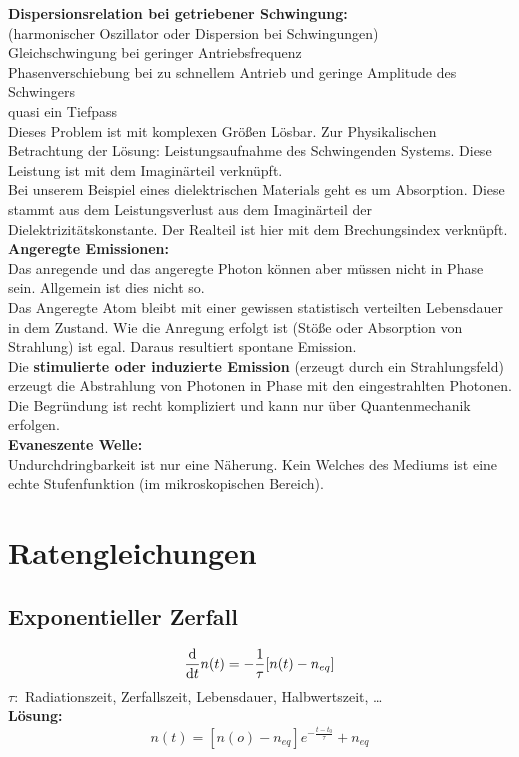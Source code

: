 \textbf{Dispersionsrelation bei getriebener Schwingung:}\\
(harmonischer Oszillator oder Dispersion bei Schwingungen)\\
Gleichschwingung bei geringer Antriebsfrequenz\\
Phasenverschiebung bei zu schnellem Antrieb und geringe Amplitude des Schwingers\\
quasi ein Tiefpass\\
Dieses Problem ist mit komplexen Größen Lösbar. Zur Physikalischen Betrachtung der Lösung: Leistungsaufnahme des Schwingenden Systems. Diese Leistung ist mit dem Imaginärteil verknüpft.\\
Bei unserem Beispiel eines dielektrischen Materials geht es um Absorption. Diese stammt aus dem Leistungsverlust aus dem Imaginärteil der Dielektrizitätskonstante. Der Realteil ist hier mit dem Brechungsindex verknüpft.\\[5pt]
\textbf{Angeregte Emissionen:}\\
Das anregende und das angeregte Photon können aber müssen nicht in Phase sein. Allgemein ist dies nicht so.\\
Das Angeregte Atom bleibt mit einer gewissen statistisch verteilten Lebensdauer in dem Zustand. Wie die Anregung erfolgt ist (Stöße oder Absorption von Strahlung) ist egal. Daraus resultiert spontane Emission.\\
Die \textbf{stimulierte oder induzierte Emission} (erzeugt durch ein Strahlungsfeld) erzeugt die Abstrahlung von Photonen in Phase mit den eingestrahlten Photonen. Die Begründung ist recht kompliziert und kann nur über Quantenmechanik erfolgen.\\[5pt]
\textbf{Evaneszente Welle:}\\
Undurchdringbarkeit ist nur eine Näherung. Kein Welches des Mediums ist eine echte Stufenfunktion (im mikroskopischen Bereich).


\section{Ratengleichungen}

\subsection{Exponentieller Zerfall}

\begin{equation*}
\frac{\textrm{d} }{\textrm{d} t} n(t) = - \frac{1}{\tau} [n(t) - n_{eq} ]
\end{equation*}
$ \tau : $ Radiationszeit, Zerfallszeit, Lebensdauer, Halbwertszeit, \dots\\
\textbf{Lösung:}
\begin{equation*}
n(t) = [n(o) - n_{eq}] e^{-\frac{t - t_0}{\tau}} + n_{eq}
\end{equation*}

